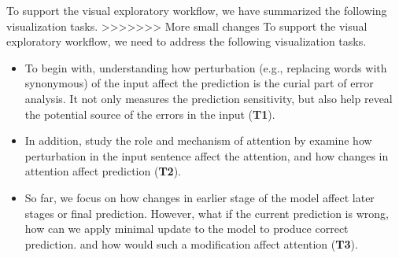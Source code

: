 %
To support the visual exploratory workflow, we have summarized the following visualization tasks.
>>>>>>> More small changes
%
To support the visual exploratory workflow, we need to address the following visualization tasks.

\begin{itemize}

\item To begin with, understanding how perturbation (e.g., replacing words with synonymous) of the input affect the prediction is the curial part of error analysis. It not only measures the prediction sensitivity, but also help reveal the potential source of the errors in the input (\textbf{T1}).

\item In addition, study the role and mechanism of attention by examine how perturbation in the input sentence affect the attention, and how changes in attention affect prediction (\textbf{T2}).

\item So far, we focus on how changes in earlier stage of the model affect later stages or final prediction. However, what if the current prediction is wrong, how can we apply minimal update to the model to produce correct prediction. and how would such a modification affect attention (\textbf{T3}).

\end{itemize}


